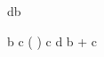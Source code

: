 \begin{eqcode}{d}{b}{}{}
   \lend
\end{eqcode}

\begin{eqcode}{\mu}{ }{ }{}
  b \in {} \lend
  c \in ( \to {}) \lend
  c \gets d \lend
  b \gets {} + c \lend %
\end{eqcode}
